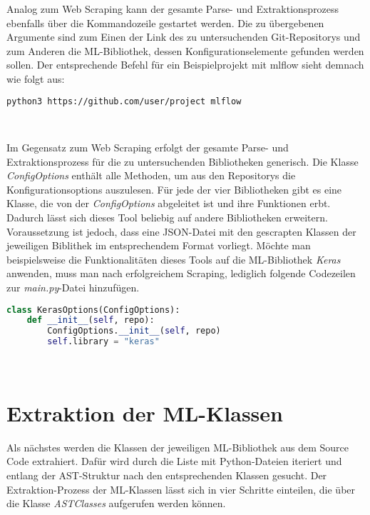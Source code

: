 \documentclass[german,bachelor]{swsLeipzig}
\begin{document}
Analog zum Web Scraping kann der gesamte Parse- und Extraktionsprozess ebenfalls über die Kommandozeile gestartet werden.
Die zu übergebenen Argumente sind zum Einen der Link des zu untersuchenden Git-Repositorys und zum Anderen die ML-Bibliothek, dessen
Konfigurationselemente gefunden werden sollen.
Der entsprechende Befehl für ein Beispielprojekt mit mlflow sieht demnach wie folgt aus: \\

\begin{lstlisting}[language=bash, frame=single, basicstyle=\small]
python3 https://github.com/user/project mlflow
\end{lstlisting}
\

Im Gegensatz zum Web Scraping erfolgt der gesamte Parse- und Extraktionsprozess für die zu untersuchenden Bibliotheken generisch.
Die Klasse \textit{ConfigOptions} enthält alle Methoden, um aus den Repositorys die Konfigurationsoptions auszulesen.
Für jede der vier Bibliotheken gibt es eine Klasse, die von der \textit{ConfigOptions} abgeleitet ist und ihre Funktionen erbt.
Dadurch lässt sich dieses Tool beliebig auf andere Bibliotheken erweitern.
Voraussetzung ist jedoch, dass eine JSON-Datei mit den gescrapten Klassen der jeweiligen Biblithek im entsprechendem Format vorliegt.
Möchte man beispielsweise die Funktionalitäten dieses Tools auf die ML-Bibliothek \textit{Keras} anwenden, muss man nach erfolgreichem Scraping,
lediglich folgende Codezeilen zur \textit{main.py}-Datei hinzufügen.\\

\begin{lstlisting}[language=Python, frame=single, basicstyle=\small]
class KerasOptions(ConfigOptions):
    def __init__(self, repo):
        ConfigOptions.__init__(self, repo)
        self.library = "keras"
\end{lstlisting}
\


\section{Extraktion der ML-Klassen}\label{Classes}
Als nächstes werden die Klassen der jeweiligen ML-Bibliothek aus dem Source Code extrahiert.
Dafür wird durch die Liste mit Python-Dateien iteriert und entlang der AST-Struktur nach den entsprechenden Klassen gesucht.
Der Extraktion-Prozess der ML-Klassen lässt sich in vier Schritte einteilen, die über die Klasse
\textit{ASTClasses} aufgerufen werden können.
\end{document}
